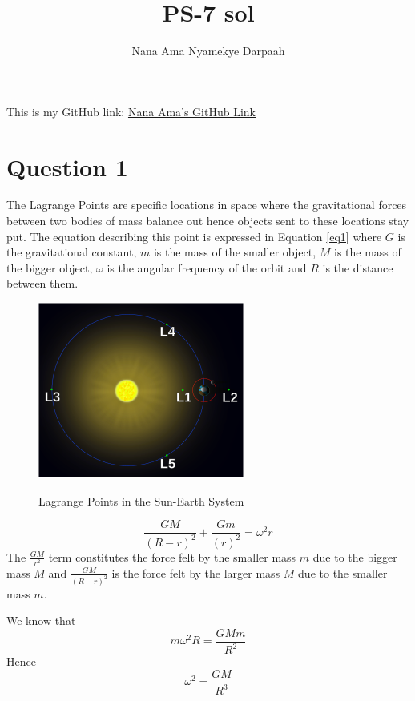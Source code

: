 \documentclass[11pt]{article}
\title{PS-7 sol}
\author{Nana Ama Nyamekye Darpaah}
\begin{document}
	
	\maketitle
	This is my GitHub link: \href{https://github.com/nnd2016/phys-ga2000.git}{Nana Ama's GitHub Link}
	
	\section{Question 1}
	
	The Lagrange Points are specific locations in space where the gravitational forces between two bodies of mass balance out hence objects sent to these locations stay put. The equation describing this point is expressed in Equation \ref{eq1} where $G$ is the gravitational constant, $m$ is the mass of the smaller object, $M$ is the mass of the bigger object, $\omega$ is the angular frequency of the orbit and $R$ is the distance between them.
	\begin{figure}[!h]
		
		\centering
		\includegraphics[width=0.53\linewidth]{lagrange_pic.png}
		\caption{Lagrange Points in the Sun-Earth System}\cite{website:wiki_lagrange}
		\label{fig:sun-earth}
		
	\end{figure}
	
	\begin{equation}
		\frac{GM}{(R-r)^{2}} + \frac{Gm}{(r)^{2}} = \omega^{2} r
		\label{eq1}
	\end{equation}
	The $\frac{GM}{r^{2}}$ term constitutes the force felt by the smaller mass $m$ due to the bigger mass $M$ and $\frac{GM}{(R-r)^{2}}$ is the force felt by the larger mass $M$ due to the smaller mass $m$.
	
	We know that 
	\begin{equation}
		m\omega^{2} R = \frac{GMm}{R^{2}}
	\end{equation}
	Hence
	\begin{equation}
		\omega^{2}  = \frac{GM}{R^{3}}
	\end{equation}
\end{document}
